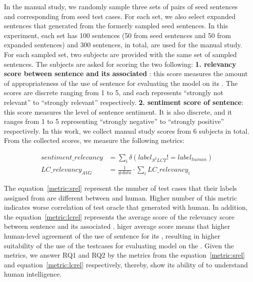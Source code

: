 In the manual study, we randomly sample three sets of pairs of seed
sentences and corresponding \lc from seed test cases. For each set, we
also select expanded sentences that \tool generated from the formerly
sampled seed sentences. In this experiment, each set has 100 sentences
(50 from seed sentences and 50 from expanded sentences) and 300
sentences, in total, are used for the manual study. For each sampled
set, two subjects are provided with the same set of sampled
sentences. The subjects are asked for scoring the two following:
\textbf{1. relevancy score between sentence and its associated \lc}:
this score measures the amount of appropriateness of the use of
sentence for evaluating the model on its \lc.  The scores are discrete
ranging from 1 to 5, and each represents ``strongly not relevant'' to
``strongly relevant'' respectively. \textbf{2. sentiment score of
  sentence}: this score measures the level of sentence sentiment. It
is also discrete, and it ranges from 1 to 5 representing ``strongly
negative'' to ``strongly positive'' respectively. In this work, we
collect manual study scores from 6 subjects in total. From the
collected scores, we measure the following metrics:

\begin{eqnarray}
  sentiment\_relecancy &= \sum_{i} \delta(label_{S^2LCT}!=label_{human}) \label{metric:srel} \\
  LC\_relevancy_{AVG} &= \frac{1}{\#data}\cdot\sum_{i} LC\_relevancy_i \label{metric:lcrel}
\end{eqnarray}

The equation~\ref{metric:srel} represent the number of test cases that
their labels assigned from are different between \tool and
human. Higher number of this metric indicates worse correlation of
test oracle that \tool generated with human. In addition, the
equation~\ref{metric:lcrel} represents the average score of the
relevancy score between sentence and its associated \lc. higer average
score means that higher human-level agreement of the use of sentence
for its \lc, resulting in higher suitability of the use of the
testcases for evaluating model on the \lc. Given the metrics, we
answer RQ1 and RQ2 by the metrics from the equation~\ref{metric:srel}
and equation~\ref{metric:lcrel} respectively, thereby, show its ability
of \tool to understand human intelligence.

